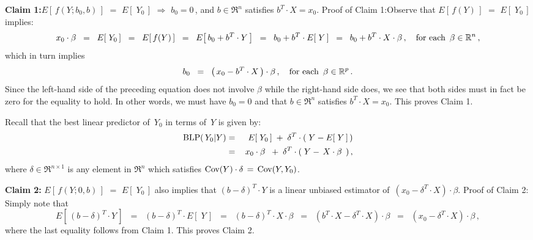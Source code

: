 \vskip 0.3cm
\noindent
\textbf{Claim 1:}\quad $E\!\left[\,f(Y;b_{0},b)\,\right]$ $=$ $E\!\left[\;Y_{0}\,\right]$
\;\;$\Longrightarrow$\;\; $b_{0} = 0$\,, \;and\; $b \in \Re^{n}$ satisfies $b^{T}\cdot X = x_{0}$.
\mbox{}\vskip 0.2cm\noindent
Proof of Claim 1:\quad Observe that $E\!\left[\,f(Y)\,\right]$ $=$ $E\!\left[\;Y_{0}\,\right]$ implies:
\begin{equation*}
x_{0} \cdot \beta
\;\; = \;\;
	E\!\left[\;Y_{0}\,\right]
\;\; = \;\;
	E\!\left[\,f(Y)\,\right]
\;\; = \;\;
	E\!\left[\,b_{0} + b^{T}\cdot Y\,\right]
\;\; = \;\;
	b_{0} + b^{T}\cdot E\!\left[\;Y\,\right]
\;\; = \;\;
	b_{0} + b^{T}\cdot X \cdot \beta\,,
	\quad
	\textnormal{for each \,$\beta\in\Re^{n}$}\,,
\end{equation*}
which in turn implies
\begin{equation*}
b_{0}
\;\; = \;\;
	\left(\,x_{0} - b^{T}\cdot X\,\right) \cdot \beta\,,
	\quad
	\textnormal{for each \,$\beta\in\Re^{p}$}\,.
\end{equation*}
Since the left-hand side of the preceding equation does not involve $\beta$
while the right-hand side does, we see that both sides must in fact be zero for the equality to hold.
In other words, we must have $b_{0} = 0$ and that $b \in \Re^{n}$ satisfies $b^{T} \cdot X = x_{0}$.
This proves Claim 1.

\vskip 0.5cm
\noindent
Recall that the best linear predictor of \,$Y_{0}$ in terms of \,$Y$ is given by:
\begin{eqnarray*}
\blp(\,Y_{0}\vert Y)
& = &
	E\!\left[\;Y_{0}\,\right] \; + \; \delta^{T}\cdot(\;Y - E\!\left[\;Y\,\right]\,)
\\
& = &
	\,x_{0}\cdot\beta{\color{white}.} \; + \; \delta^{T}\cdot(\;Y - \,X\cdot\beta\,\;)\,,
\end{eqnarray*}
where $\delta \in \Re^{n \times 1}$ is any element in $\Re^{n}$ which satisfies
$\Cov(Y) \cdot \delta \,=\, \Cov(Y,Y_{0})$.

\vskip 0.5cm
\noindent
\textbf{Claim 2:}\quad
$E\!\left[\,f(Y;0,b)\,\right]$ $=$ $E\!\left[\;Y_{0}\,\right]$
also implies that
$(b - \delta)^{T}\cdot Y$ is a linear unbiased estimator of \,$(x_{0} - \delta^{T}\cdot X)\cdot\beta$.
\vskip 0.2cm
\noindent
Proof of Claim 2:\quad
Simply note that
\begin{equation*}
E\!\left[\,(b - \delta)^{T}\cdot Y\,\right]
\;\; = \;\;
	(b - \delta)^{T} \cdot E\!\left[\;Y\,\right]
\;\; = \;\;
	(b - \delta)^{T} \cdot X \cdot \beta
\;\; = \;\;
	(b^{T}\cdot X - \delta^{T} \cdot X) \cdot \beta
\;\; = \;\;
	(x_{0} - \delta^{T} \cdot X) \cdot \beta\,,
\end{equation*}
where the last equality follows from Claim 1.
This proves Claim 2.

